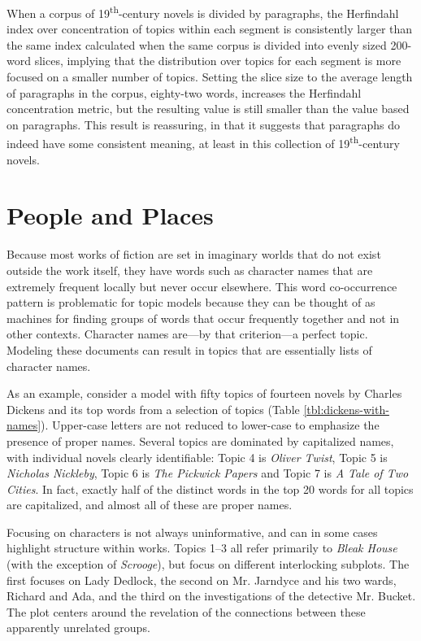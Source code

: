 When a corpus of 19\textsuperscript{th}-century novels is divided by paragraphs, the Herfindahl index over concentration of topics within each segment is consistently larger than the same index calculated when the same corpus is divided into evenly sized 200-word slices, implying that the distribution over topics for each segment is more focused on a smaller number of topics.
Setting the slice size to the average length of paragraphs in the corpus, eighty-two words, increases the Herfindahl concentration metric, but the resulting value is still smaller than the value based on paragraphs.
This result is reassuring, in that it suggests that paragraphs do indeed have some consistent meaning, at least in this collection of 19\textsuperscript{th}-century novels.



\section{People and Places}

Because most works of fiction are set in imaginary worlds that do not exist outside the work itself, they have words such as character names that are extremely frequent locally but never occur elsewhere.
This word co-occurrence pattern is problematic for topic models because they can be thought of as machines for finding groups of words that occur frequently together and not in other contexts.
Character names are---by that criterion---a perfect topic.
Modeling these documents can result in topics that are essentially lists of character names.

As an example, consider a model with fifty topics of fourteen novels by Charles Dickens and its top words from a selection of topics (Table \ref{tbl:dickens-with-names}).
Upper-case letters are not reduced to lower-case to emphasize the presence of proper names.
Several topics are dominated by capitalized names, with individual novels clearly identifiable: Topic 4 is {\em Oliver Twist}, Topic 5 is {\em Nicholas Nickleby}, Topic 6 is {\em The Pickwick Papers} and Topic 7 is {\em A Tale of Two Cities}.
In fact, exactly half of the distinct words in the top 20 words for all topics are capitalized, and almost all of these are proper names.

Focusing on characters is not always uninformative, and can in some cases highlight structure within works.
Topics 1--3 all refer primarily to {\em Bleak House} (with the exception of {\em Scrooge}), but focus on different interlocking subplots.
The first focuses on Lady Dedlock, the second on Mr. Jarndyce and his two wards, Richard and Ada, and the third on the investigations of the detective Mr. Bucket.
The plot centers around the revelation of the connections between these apparently unrelated groups.


